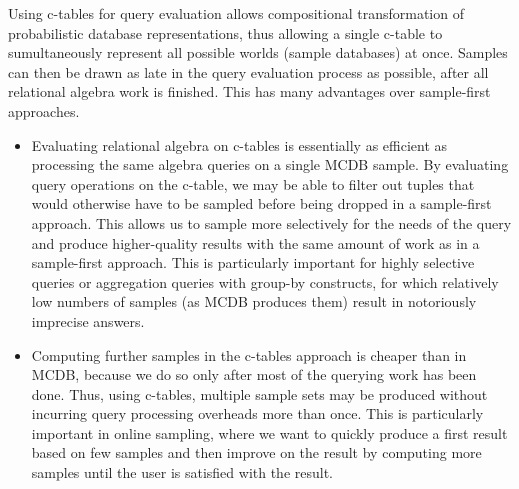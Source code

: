 Using c-tables  for  query evaluation  allows  compositional  transformation of probabilistic  database representations, thus allowing a single c-table to sumultaneously represent  all possible worlds  (sample databases) at once. Samples can then be drawn as late in the query evaluation process as possible,  after all relational algebra work is finished. This has  many advantages over  sample-first approaches.
\begin{itemize}
\addtolength{\topsep}{-0.3ex}
\addtolength{\labelsep}{-0.3ex}
\addtolength{\itemsep}{-1ex}
\item
Evaluating relational algebra on c-tables is  essentially as efficient as processing  the same algebra queries on a  single  MCDB  sample. By evaluating query operations on  the c-table, we may be able  to filter out tuples that would otherwise have to be  sampled before being dropped  in a sample-first approach.  This allows us  to sample more selectively  for the needs of  the query and produce higher-quality results with  the same amount of work as in a sample-first approach. This  is particularly important for highly  selective queries or aggregation queries with group-by constructs, for which relatively low numbers   of   samples   (as   MCDB   produces   them) result in notoriously imprecise answers.

\item
Computing further samples in the c-tables approach is  cheaper than in  MCDB, because  we do  so only  after most  of the querying  work  has been  done.   Thus,  using  c-tables, multiple sample sets may be produced without incurring query processing overheads more than once.  This is particularly important in online  sampling, where we want to  quickly produce  a first  result based on few samples and then  improve on the result by computing more samples until the user is satisfied with the result.

\end{itemize}


